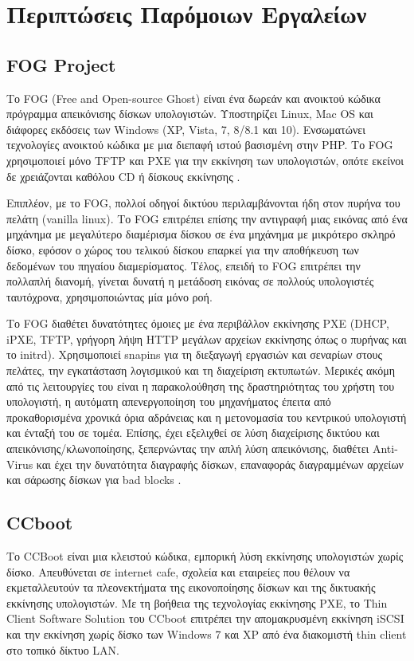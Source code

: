\section{Περιπτώσεις Παρόμοιων Εργαλείων}
\subsection{FOG Project}
Το FOG (Free and Open-source Ghost) είναι ένα δωρεάν και ανοικτού κώδικα πρόγραμμα απεικόνισης δίσκων υπολογιστών. Υποστηρίζει Linux, Mac OS και διάφορες εκδόσεις των Windows (XP, Vista, 7, 8/8.1 και 10). Ενσωματώνει τεχνολογίες ανοικτού κώδικα με μια διεπαφή ιστού βασισμένη στην PHP. Το FOG χρησιμοποιεί μόνο TFTP και PXE για την εκκίνηση των υπολογιστών, οπότε εκείνοι δε χρειάζονται καθόλου CD ή δίσκους εκκίνησης \cite{FOG_Project_2020}.

Επιπλέον, με το FOG, πολλοί οδηγοί δικτύου περιλαμβάνονται ήδη στον πυρήνα του πελάτη (vanilla linux). Το FOG επιτρέπει επίσης την αντιγραφή μιας εικόνας από ένα μηχάνημα με μεγαλύτερο διαμέρισμα δίσκου σε ένα μηχάνημα με μικρότερο σκληρό δίσκο, εφόσον ο χώρος του τελικού δίσκου επαρκεί για την αποθήκευση των δεδομένων του πηγαίου διαμερίσματος. Τέλος, επειδή το FOG επιτρέπει την πολλαπλή διανομή, γίνεται δυνατή η μετάδοση εικόνας σε πολλούς υπολογιστές ταυτόχρονα, χρησιμοποιώντας μία μόνο ροή.

Το FOG διαθέτει δυνατότητες όμοιες με ένα περιβάλλον εκκίνησης PXE (DHCP, iPXE, TFTP, γρήγορη λήψη HTTP μεγάλων αρχείων εκκίνησης όπως ο πυρήνας και το initrd). Χρησιμοποιεί snapins για τη διεξαγωγή εργασιών και σεναρίων στους πελάτες, την εγκατάσταση λογισμικού και τη διαχείριση εκτυπωτών. Μερικές ακόμη από τις λειτουργίες του είναι η παρακολούθηση της δραστηριότητας του χρήστη του υπολογιστή, η αυτόματη απενεργοποίηση του μηχανήματος έπειτα από προκαθορισμένα χρονικά όρια αδράνειας και η μετονομασία του κεντρικού υπολογιστή και ένταξή του σε τομέα. Επίσης, έχει εξελιχθεί σε λύση διαχείρισης δικτύου και απεικόνισης/κλωνοποίησης, ξεπερνώντας την απλή λύση απεικόνισης, διαθέτει Anti-Virus και έχει την δυνατότητα διαγραφής δίσκων, επαναφοράς διαγραμμένων αρχείων και σάρωσης δίσκων για bad blocks \cite{FOG_2020}.

\subsection{CCboot}
Το CCBoot είναι μια κλειστού κώδικα, εμπορική λύση εκκίνησης υπολογιστών χωρίς δίσκο. Aπευθύνεται σε internet cafe, σχολεία και εταιρείες που θέλουν να εκμεταλλευτούν τα πλεονεκτήματα της εικονοποίησης δίσκων και της δικτυακής εκκίνησης υπολογιστών. Με τη βοήθεια της τεχνολογίας εκκίνησης PXE, το Thin Client Software Solution του CCboot επιτρέπει την απομακρυσμένη εκκίνηση iSCSI και την εκκίνηση χωρίς δίσκο των Windows 7 και XP από ένα διακομιστή thin client στο τοπικό δίκτυο LAN.

